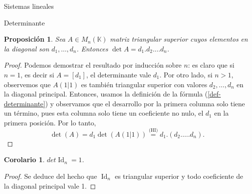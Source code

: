 \documentclass[a4paper,12pt,twoside,spanish,reqno]{amsbook}
\numberwithin{equation}{section}
\newtheorem{proposicion}[teorema]{Proposici\'on}
\newtheorem{corolario}[teorema]{Corolario}
\theoremstyle{definition}
\theoremstyle{remark}
\newcommand{\Id}{\operatorname{Id}}
\newcommand{\K}{\mathbb K}
\begin{document}
\begin{chapter}{Sistemas lineales}
\begin{section}{Determinante}
\begin{comment}
        En  el caso  que  $A$ sea triangular inferior también lo demostraremos por inducción. El caso $n=1$ es trivial. Si $n >1$, observemos que  $A(1|1)$ es también triangular inferior con valores $d_2,\ldots,d_n$  en la diagonal principal y si $i >1$, $A(i|1)$ es triangular inferior con el primer valor en la diagonal igual a 0. Por hipótesis inductiva $\det(A(1|1)) = d_2.\ldots.d_n$ y si $i >1$, $\det(A(i|1)) = 0\times \ldots = 0$, por lo tanto 
        \begin{equation*}
        \det(A) = d_1 \det(A(1|1))+ \sum_{i=2}^{n} a_{i1}\det(A(i|1)) =  d_1.(d_2.\ldots.d_n) + 0.
        \end{equation*} 
        \end{proof}
    \end{comment}

    \begin{proposicion}\label{det-triang-sup}
    Sea $A \in M_n(\K)$ matriz triangular  superior cuyos elementos en la diagonal son $d_1,\ldots,d_n$. Entonces $\det A = d_1.d_2.\ldots d_n$.
    \end{proposicion}
    \begin{proof} Podemos demostrar el resultado por inducción sobre $n$: es claro que si $n=1$,  es decir si $A = [d_1]$, el determinante vale $d_1$. Por otro lado, si $n>1$,  observemos que $A(1|1)$ es también triangular superior con valores $d_2,\ldots,d_n$  en la diagonal principal. Entonces,  usamos la definición de la fórmula (\ref{def-determinante}) y observamos que el desarrollo por la primera  columna solo tiene un término, pues esta columna solo tiene un coeficiente no nulo, el $d_1$ en la primera posición. Por lo tanto, 
        \begin{equation*}
        \det(A) = d_1 \det(A(1|1)) \stackrel{\text{(HI)}}{=} d_1.(d_2.\ldots.d_n).
        \end{equation*}
    \end{proof}
    
    \begin{corolario}
        $det \Id_n = 1$.
    \end{corolario}
    \begin{proof}
        Se deduce del hecho que $\Id_n$  es triangular superior y todo coeficiente de la diagonal principal vale 1.
    \end{proof}
    

\end{section}
\end{chapter}
\end{document}
